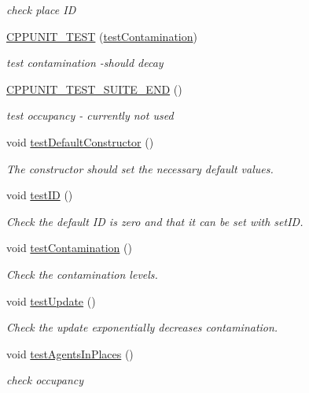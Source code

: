 \begin{DoxyCompactItemize}
\begin{DoxyCompactList}\small\item\em check place ID \end{DoxyCompactList}\item 
\mbox{\label{classplaceTest_a102cedb00ff7312ce527285210eebeff}} 
\mbox{\hyperlink{classplaceTest_a102cedb00ff7312ce527285210eebeff}{C\+P\+P\+U\+N\+I\+T\+\_\+\+T\+E\+ST}} (\mbox{\hyperlink{classplaceTest_a12e071effa88774bb49e498632d19846}{test\+Contamination}})
\begin{DoxyCompactList}\small\item\em test contamination -\/should decay \end{DoxyCompactList}\item 
\mbox{\label{classplaceTest_a5f2d3f4fecd70536be029afc85858908}} 
\mbox{\hyperlink{classplaceTest_a5f2d3f4fecd70536be029afc85858908}{C\+P\+P\+U\+N\+I\+T\+\_\+\+T\+E\+S\+T\+\_\+\+S\+U\+I\+T\+E\+\_\+\+E\+ND}} ()
\begin{DoxyCompactList}\small\item\em test occupancy -\/ currently not used \end{DoxyCompactList}\item 
void \mbox{\hyperlink{classplaceTest_a7f6879744d411bded42d786645595245}{test\+Default\+Constructor}} ()
\begin{DoxyCompactList}\small\item\em The constructor should set the necessary default values. \end{DoxyCompactList}\item 
\mbox{\label{classplaceTest_a1e4e638d2e34b0c247fe82455985aa34}} 
void \mbox{\hyperlink{classplaceTest_a1e4e638d2e34b0c247fe82455985aa34}{test\+ID}} ()
\begin{DoxyCompactList}\small\item\em Check the default ID is zero and that it can be set with set\+ID. \end{DoxyCompactList}\item 
void \mbox{\hyperlink{classplaceTest_a12e071effa88774bb49e498632d19846}{test\+Contamination}} ()
\begin{DoxyCompactList}\small\item\em Check the contamination levels. \end{DoxyCompactList}\item 
void \mbox{\hyperlink{classplaceTest_acc20c36b8c0e62cea5068b3707e98237}{test\+Update}} ()
\begin{DoxyCompactList}\small\item\em Check the update exponentially decreases contamination. \end{DoxyCompactList}\item 
void \mbox{\hyperlink{classplaceTest_a095889ea563a243152e41a0e05fffbc2}{test\+Agents\+In\+Places}} ()
\begin{DoxyCompactList}\small\item\em check occupancy \end{DoxyCompactList}\end{DoxyCompactItemize}
